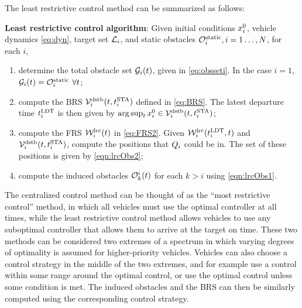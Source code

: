 The least restrictive control method can be summarized as follows:
\begin{alg}
\label{alg:lrc}
\textbf{Least restrictive control algorithm}: Given initial conditions $x_i^0$, vehicle dynamics \eqref{eq:dyn}, target set $\mathcal{L}_i$, and static obstacles $\mathcal{O}^\text{static}_i, i = 1\ldots, N$, for each $i$,
\begin{enumerate}[leftmargin = 0.5cm]
\item determine the total obstacle set $\mathcal{G}_i(t)$, given in \eqref{eq:obsseti}. In the case $i=1$, $\mathcal{G}_i(t) = \mathcal{O}^\text{static}_i ~ \forall t$;
\item compute the BRS $\mathcal{V}_i^\text{dstb}(t, t^\text{STA}_i)$ defined in \eqref{eq:BRS}. The latest departure time $t^\text{LDT}_i$ is then given by $\arg \sup_t x_{i}^0 \in \mathcal{V}_i^\text{dstb}(t, t^\text{STA}_i)$;
\item compute the FRS $\mathcal{W}_i^\text{lrc}(t)$ in \eqref{eq:FRS2}. Given $\mathcal{W}_i^\text{lrc}(t^\text{LDT}_i, t)$ and $\mathcal{V}_i^\text{dstb}(t, t^\text{STA}_i)$, compute the positions that $Q_i$ could be in. The set of these positions is given by \eqref{eqn:lrcObs2};
\item compute the induced obstacles $\mathcal{O}_k^i(t)$ for each $k>i$ using \eqref{eqn:lrcObs1}.
\end{enumerate}
\end{alg}

\begin{remark}
The centralized control method can be thought of as the ``most restrictive control'' method, in which all vehicles must use the optimal controller at all times, while the least restrictive control method allows vehicles to use any suboptimal controller that allows them to arrive at the target on time. These two methods can be considered two extremes of a spectrum in which varying degrees of optimality is assumed for higher-priority vehicles. Vehicles can also choose a control strategy in the middle of the two extremes, and for example use a control within some range around the optimal control, or use the optimal control unless some condition is met. The induced obstacles and the BRS can then be similarly computed using the corresponding control strategy.
\end{remark}
